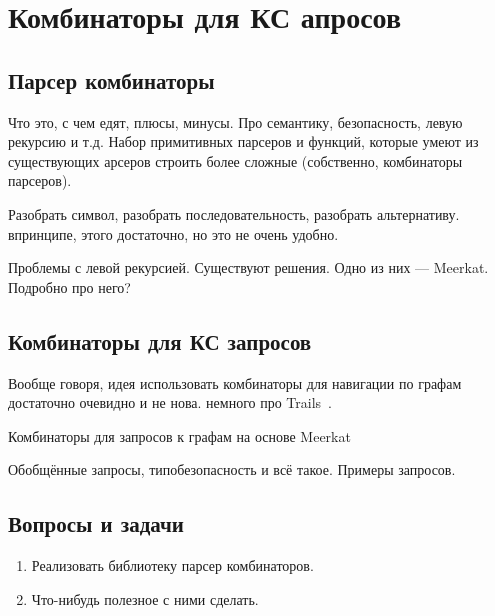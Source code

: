 \chapter{Комбинаторы для КС апросов}

\section{Парсер комбинаторы}

Что это, с чем едят, плюсы, минусы. Про семантику, безопасность, левую рекурсию и т.д.
Набор примитивных парсеров и функций, которые умеют из существующих арсеров строить более сложные (собственно, комбинаторы парсеров).

Разобрать символ, разобрать последовательность, разобрать альтернативу. впринципе, этого достаточно, но это не очень удобно.

Проблемы с левой рекурсией.
Существуют решения. Одно из них --- Meerkat.
Подробно про него?

\section{Комбинаторы для КС запросов}

Вообще говоря, идея использовать комбинаторы для навигации по графам достаточно очевидно и не нова.
немного про Trails~\cite{Kroni:2013:PGA:2489837.2489844}.

Комбинаторы для запросов к графам на основе Meerkat~\cite{Verbitskaia:2018:PCC:3241653.3241655}

Обобщённые запросы, типобезопасность и всё такое.
Примеры запросов.

\section{Вопросы и задачи}
\begin{enumerate}
  \item Реализовать библиотеку парсер комбинаторов.
  \item Что-нибудь полезное с ними сделать.
\end{enumerate}
